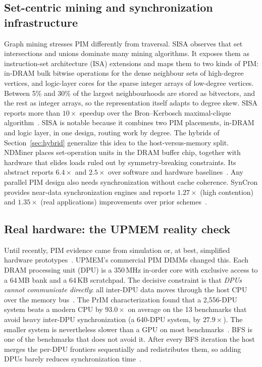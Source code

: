 \documentclass[journal,onecolumn]{IEEEtran}
\begin{document}
\subsection{Set-centric mining and synchronization infrastructure}
Graph mining stresses PIM differently from traversal. SISA observes that set intersections and unions dominate many mining algorithms. It exposes them as instruction-set architecture (ISA) extensions and maps them to two kinds of PIM: in-DRAM bulk bitwise operations for the dense neighbour sets of high-degree vertices, and logic-layer cores for the sparse integer arrays of low-degree vertices. Between 5\% and 30\% of the largest neighbourhoods are stored as bitvectors, and the rest as integer arrays, so the representation itself adapts to degree skew. SISA reports more than $10\times$ speedup over the Bron--Kerbosch maximal-clique algorithm~\cite{besta2021sisa}. SISA is notable because it combines two PIM placements, in-DRAM and logic layer, in one design, routing work by degree. The hybrids of Section~\ref{sec:hybrid} generalize this idea to the host-versus-memory split. NDMiner places set-operation units in the DRAM buffer chip, together with hardware that elides loads ruled out by symmetry-breaking constraints. Its abstract reports $6.4\times$ and $2.5\times$ over software and hardware baselines~\cite{talati2022ndminer}. Any parallel PIM design also needs synchronization without cache coherence. SynCron provides near-data synchronization engines and reports $1.27\times$ (high contention) and $1.35\times$ (real applications) improvements over prior schemes~\cite{giannoula2021syncron}.

\subsection{Real hardware: the UPMEM reality check}
Until recently, PIM evidence came from simulation or, at best, simplified hardware prototypes~\cite{gomezluna2022prim}. UPMEM's commercial PIM DIMMs changed this. Each DRAM processing unit (DPU) is a 350\,MHz in-order core with exclusive access to a 64\,MB bank and a 64\,KB scratchpad. The decisive constraint is that \emph{DPUs cannot communicate directly}: all inter-DPU data moves through the host CPU over the memory bus~\cite{gomezluna2022prim}. The PrIM characterization found that a 2,556-DPU system beats a modern CPU by $93.0\times$ on average on the 13 benchmarks that avoid heavy inter-DPU synchronization (a 640-DPU system, by $27.9\times$). The smaller system is nevertheless slower than a GPU on most benchmarks~\cite{gomezluna2022prim}. BFS is one of the benchmarks that does not avoid it. After every BFS iteration the host merges the per-DPU frontiers sequentially and redistributes them, so adding DPUs barely reduces synchronization time~\cite{gomezluna2022prim}.
\end{document}

